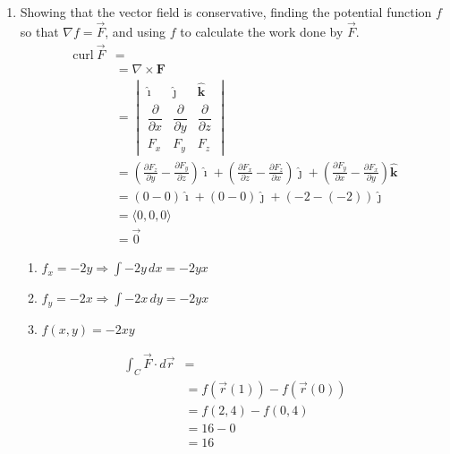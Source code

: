\documentclass[letter,11pt]{article}
\begin{document}
\begin{enumerate}[label = \roman*.]
    \item Showing that the vector field is conservative, finding the potential function $f$ so that $\nabla f = \vec{F}$, and using $f$ to calculate the work done by $\vec{F}$.
    \begin{align*}
    \mathrm{curl}~\vec{F} &= \\
    &= \nabla \times \mathbf{F} \\
    &= \begin{vmatrix} \boldsymbol{\hat\imath} & \boldsymbol{\hat\jmath} & \boldsymbol{\hat k} \\{\dfrac{\partial}{\partial x}} & {\dfrac{\partial}{\partial y}} & {\dfrac{\partial}{\partial z}} \\F_x & F_y & F_z \end{vmatrix} \\
    &= \left(\frac{\partial F_z}{\partial y} - \frac{\partial F_y}{\partial z}\right) \boldsymbol{\hat\imath} + \left(\frac{\partial F_x}{\partial z} - \frac{\partial F_z}{\partial x} \right) \boldsymbol{\hat\jmath} + \left(\frac{\partial F_y}{\partial x} - \frac{\partial F_x}{\partial y} \right) \boldsymbol{\hat k}\\
    &= (0-0)\boldsymbol{\hat\imath} + (0-0)\boldsymbol{\hat\jmath} + (-2-(-2))\boldsymbol{\hat\jmath}\\
    &=\langle 0,0,0\rangle \\
    &= \vec{0}
\end{align*}
    \begin{enumerate}
        \item $f_x= -2y \Longrightarrow \int -2y \, dx = -2yx$
        \item $f_y= -2x \Longrightarrow \int -2x \, dy = -2yx$
        \item $f(x,y)=-2xy$
    \end{enumerate}
    \begin{align*}
        \int_{C}\vec{F}\cdot d\vec{r} &=\\
        &= f\left(\vec{r}(1)\right)-f\left(\vec{r}(0)\right)\\
        &= f\left(2,4\right)-f\left(0,4\right)\\
        &= 16-0\\
        &= \boxed{16}
    \end{align*}
\end{enumerate}
\end{document}
